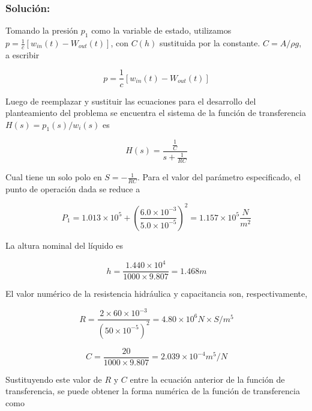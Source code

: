 \documentclass[a4paper,12pt,twoside]{proyectotanquesecci}
\begin{document}
\subsubsection{Solución:}

Tomando la presión $p_{1}$ como la variable de estado, utilizamos $p=\frac {1}{c}\left[ w_{in}\left( t\right) -W_{out}\left( t\right) \right]$, con $C\left(h\right)$ sustituida por la constante. $C=A/\rho g$, a escribir

\begin{equation}
p=\frac {1}{c}\left[ w_{in}\left( t\right) -W_{out}\left( t\right) \right]
\end{equation}

Luego de reemplazar y sustituir las ecuaciones para el desarrollo del planteamiento del problema se encuentra el sistema de la función de transferencia $H\left( s\right) =p_{1}\left( s\right) /w_{i}\left( s\right)$ es

\begin{equation}
H\left( s\right) =\frac {\frac {1}{C}}{s+\frac {1}{RC}}
\end{equation}

Cual tiene un solo polo en $S=-\frac{1}{RC}$. Para el valor del parámetro especificado, el punto de operación dada se reduce a

\begin{equation}
P_{1}=1.013\times 10^{5}+\left( \frac {6.0\times 10^{-3}}{5.0\times 10^{-5}}\right) ^{2}=1.157\times 10^{5}\frac {N}{m^{2}}
\end{equation}

La altura nominal del líquido es

\begin{equation}
h=\frac {1.440\times 10^{4}}{1000\times 9.807}=1.468m
\end{equation}

El valor numérico de la resistencia hidráulica y capacitancia son, respectivamente,

\begin{equation}
R=\frac {2\times 60\times 10^{-3}}{\left( 50\times 10^{-5}\right) ^{2}}=4.80\times 10^{6}N\times S/m^{5}
\end{equation}

\begin{equation}
C=\frac {20}{1000\times 9.807}=2.039\times 10^{-4}m^{5}/N
\end{equation}

Sustituyendo este valor de $R$ y $C$ entre la ecuación anterior de la función de transferencia, se puede obtener la forma numérica  de la función de transferencia como
\end{document}
